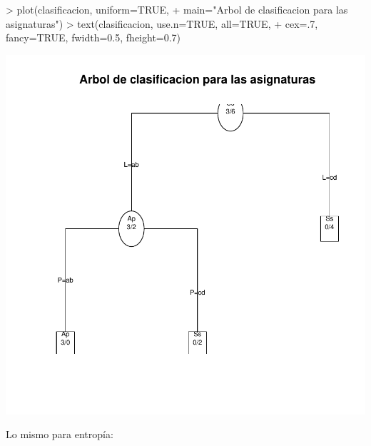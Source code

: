 \documentclass [a4paper] {article}
\begin{document}
\begin{Schunk}
\begin{Sinput}
> plot(clasificacion, uniform=TRUE, 
+ main="Arbol de clasificacion para las asignaturas")
> text(clasificacion, use.n=TRUE, all=TRUE, 
+ cex=.7, fancy=TRUE, fwidth=0.5, fheight=0.7)
\end{Sinput}
\end{Schunk}
\includegraphics{Memoria-Figura 3}

\newpage
Lo mismo para entropía:
\end{document}
